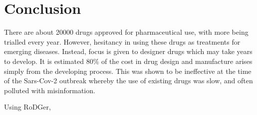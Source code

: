 \chapter{Conclusion}


\graphicspath{{Chapter6/Figs/Vector/}{Chapter6/Figs/}}




There are about 20000 drugs approved for pharmaceutical use, with more being trialled every year. However, hesitancy in using these drugs as treatments for emerging diseases. Instead, focus is given to designer drugs which may take years to develop. It is estimated 80\% of the cost in drug design and manufacture arises simply from the developing process. This was shown to be ineffective at the time of the Sars-Cov-2 outbreak whereby the use of existing drugs was slow, and often polluted with misinformation.

Using RoDGer,